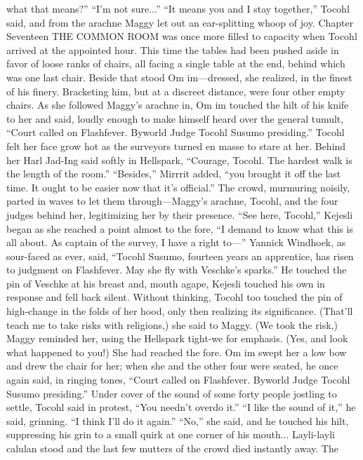 \documentclass[9pt]{article}
\begin{document}
what that means?”
“I’m not sure...”
“It means you and I stay together,” Tocohl said, and from the arachne Maggy let out an ear-splitting
whoop of joy.
Chapter Seventeen
THE COMMON ROOM was once more filled to capacity when Tocohl arrived at the appointed
hour. This time the tables had been pushed aside in favor of loose ranks of chairs, all facing a single table
at the end, behind which was one last chair. Beside that stood Om im—dressed, she realized, in the finest
of his finery. Bracketing him, but at a discreet distance, were four other empty chairs.
As she followed Maggy’s arachne in, Om im touched the hilt of his knife to her and said, loudly
enough to make himself heard over the general tumult, “Court called on Flashfever. Byworld Judge
Tocohl Susumo presiding.”
Tocohl felt her face grow hot as the surveyors turned en masse to stare at her. Behind her Harl
Jad-Ing said softly in Hellspark, “Courage, Tocohl. The hardest walk is the length of the room.”
“Besides,” Mirrrit added, “you brought it off the last time. It ought to be easier now that it’s official.”
The crowd, murmuring noisily, parted in waves to let them through—Maggy’s arachne, Tocohl, and
the four judges behind her, legitimizing her by their presence. “See here, Tocohl,” Kejesli began as she
reached a point almost to the fore, “I demand to know what this is all about. As captain of the survey, I
have a right to—”
Yannick Windhoek, as sour-faced as ever, said, “Tocohl Susumo, fourteen years an apprentice, has
risen to judgment on Flashfever. May she fly with Veschke’s sparks.” He touched the pin of Veschke at
his breast and, mouth agape, Kejesli touched his own in response and fell back silent.
Without thinking, Tocohl too touched the pin of high-change in the folds of her hood, only then
realizing its significance. (That’ll teach me to take risks with religions,) she said to Maggy.
(We took the risk,) Maggy reminded her, using the Hellspark tight-we for emphasis.
(Yes, and look what happened to you!)
She had reached the fore. Om im swept her a low bow and drew the chair for her; when she and the
other four were seated, he once again said, in ringing tones, “Court called on Flashfever. Byworld Judge
Tocohl Susumo presiding.”
Under cover of the sound of some forty people jostling to settle, Tocohl said in protest, “You needn’t
overdo it.”
“I like the sound of it,” he said, grinning. “I think I’ll do it again.”
“No,” she said, and he touched his hilt, suppressing his grin to a small quirk at one corner of his
mouth... Layli-layli calulan stood and the last few mutters of the crowd died instantly away. The
\end{document}
